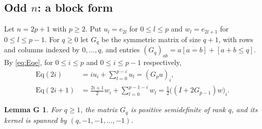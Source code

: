 \documentclass[11pt]{amsart}
\theoremstyle{plain}
\newtheorem*{lemmaG}{Lemma G}
\theoremstyle{definition}
\theoremstyle{remark}
\numberwithin{equation}{section}
\newcommand{\iv}[1]{[#1]}              %
\newcommand{\Eq}{\mathrm{Eq}}
\begin{document}
\subsection{Odd \texorpdfstring{\(n\)}{n}: a block form}
Let \(n=2p+1\) with \(p\ge2\). Put \(u_l=e_{2l}\) for \(0\le l\le p\) and
\(w_l=e_{2l+1}\) for \(0\le l\le p-1\). For \(q\ge0\) let \(G_q\) be the symmetric matrix
of size \(q+1\), with rows and columns indexed by \(0,\dots,q\), and entries
\((G_q)_{ab}=a\iv{a=b}+\iv{a+b\le q}\). By \eqref{eq:Eqe}, for \(0\le i\le p\) and
\(0\le i\le p-1\) respectively,
\begin{align*}
\Eq(2i)&=iu_i+\sum_{l=0}^{p-i}u_l=(G_pu)_i,\\
\Eq(2i+1)&=\frac{2i+1}{2}w_i+\sum_{l=0}^{p-1-i}w_l
=\tfrac12\bigl((I+2G_{p-1})w\bigr)_i.
\end{align*}

\begin{lemmaG}
For \(q\ge1\), the matrix \(G_q\) is positive semidefinite of rank \(q\), and its kernel
is spanned by \((q,-1,-1,\dots,-1)\).
\end{lemmaG}
\end{document}
